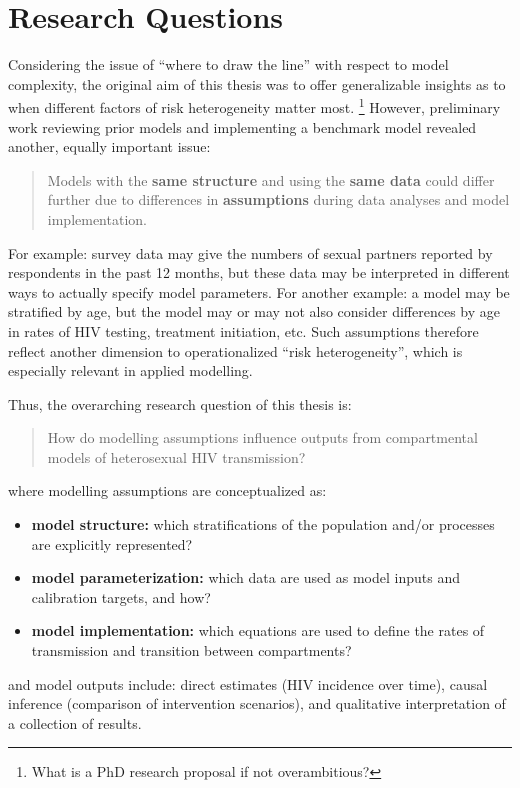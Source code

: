 \section{Research Questions}\label{intro.rqs}
Considering the issue of ``where to draw the line'' with respect to model complexity,
the original aim of this thesis was to offer generalizable insights as to
when different factors of risk heterogeneity matter most.%
\footnote{What is a PhD research proposal if not overambitious?}
However, preliminary work reviewing prior models and implementing a benchmark model
revealed another, equally important issue:
\begin{quote}
  Models with the \textbf{same structure} and using the \textbf{same data}
  could differ further due to differences in
  \textbf{assumptions} during data analyses and model implementation.
\end{quote}
For example:
survey data may give the numbers of sexual partners reported by respondents in the past 12 months,
but these data may be interpreted in different ways to actually specify model parameters.
For another example:
a model may be stratified by age, but the model may or may not also consider differences by age
in rates of HIV testing, treatment initiation, etc.
Such assumptions therefore reflect another dimension to operationalized ``risk heterogeneity'',
which is especially relevant in applied modelling.
\par
Thus, the overarching research question of this thesis is:
\begin{quote}
  How do modelling assumptions influence outputs from
  compartmental models of heterosexual HIV transmission?
\end{quote}
where modelling assumptions are conceptualized as:
\begin{itemize}
  \item \textbf{model structure:} which
  stratifications of the population and/or processes are explicitly represented?
  \item \textbf{model parameterization:} which
  data are used as model inputs and calibration targets, and how?
  \item \textbf{model implementation:} which
  equations are used to define the rates of transmission and transition between compartments?
\end{itemize}
and model outputs include:
direct estimates (\eg HIV incidence over time),
causal inference (\eg comparison of intervention scenarios), and
qualitative interpretation of a collection of results.
